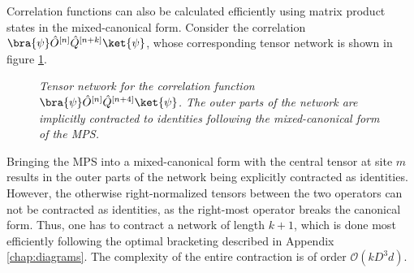 Correlation functions can also be calculated efficiently using matrix product states in the mixed-canonical form. Consider the correlation $\bra{\psi} \hat{O}^{[n]} \hat{Q}^{[n+k]} \ket{\psi}$, whose corresponding tensor network is shown in figure \ref{fig:CorrelationFunction}.
\begin{figure}[h!]
	\centering
	
	\caption{\textit{Tensor network for the correlation function $\bra{\psi} \hat{O}^{[n]} \hat{Q}^{[n+4]} \ket{\psi}$. The outer parts of the network are implicitly contracted to identities following the mixed-canonical form of the MPS.}}
	\label{fig:CorrelationFunction}
\end{figure}
Bringing the MPS into a mixed-canonical form with the central tensor at site $m$ results in the outer parts of the network being explicitly contracted as identities. However, the otherwise right-normalized tensors between the two operators can not be contracted as identities, as the right-most operator breaks the canonical form. Thus, one has to contract a network of length $k+1$, which is done most efficiently following the optimal bracketing described in Appendix \ref{chap:diagrams}. The complexity of the entire contraction is of order $\mathcal{O}(k D^3 d)$.

